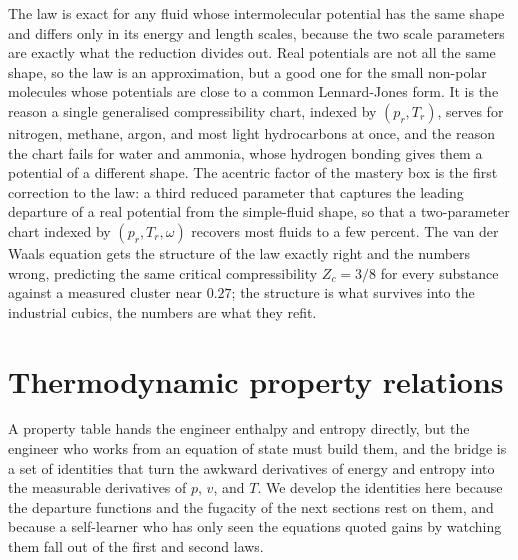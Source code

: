 The law is exact for any fluid whose intermolecular potential has the
same shape and differs only in its energy and length scales, because the
two scale parameters are exactly what the reduction divides out. Real
potentials are not all the same shape, so the law is an approximation, but
a good one for the small non-polar molecules whose potentials are close to
a common Lennard-Jones form. It is the reason a single generalised
compressibility chart, indexed by $(p_r, T_r)$, serves for nitrogen,
methane, argon, and most light hydrocarbons at once, and the reason the
chart fails for water and ammonia, whose hydrogen bonding gives them a
potential of a different shape. The acentric factor of the mastery box is
the first correction to the law: a third reduced parameter that captures
the leading departure of a real potential from the simple-fluid shape, so
that a two-parameter chart indexed by $(p_r, T_r, \omega)$ recovers most
fluids to a few percent. The van der Waals equation gets the structure of
the law exactly right and the numbers wrong, predicting the same critical
compressibility $Z_c = 3/8$ for every substance against a measured cluster
near $0.27$; the structure is what survives into the industrial cubics,
the numbers are what they refit.

\section{Thermodynamic property relations}

A property table hands the engineer enthalpy and entropy directly, but the
engineer who works from an equation of state must build them, and the
bridge is a set of identities that turn the awkward derivatives of energy
and entropy into the measurable derivatives of $p$, $v$, and $T$. We
develop the identities here because the departure functions and the
fugacity of the next sections rest on them, and because a self-learner who
has only seen the equations quoted gains by watching them fall out of the
first and second laws.

